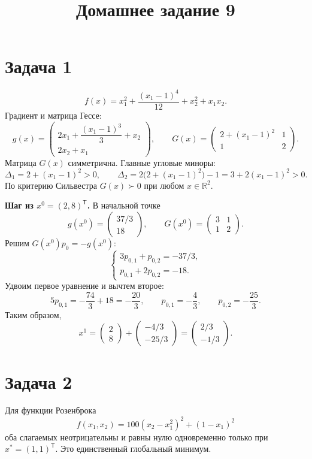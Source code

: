 \documentclass[12pt,a4paper]{article}
\title{Домашнее задание 9}
\author{}
\date{}
\newcommand{\R}{\mathbb R}
\newcommand{\T}{^{\mathsf T}}
\begin{document}
\maketitle

\section*{Задача 1}
\[
f(x)=x_1^2+\frac{(x_1-1)^4}{12}+x_2^2+x_1x_2.
\]
Градиент и матрица Гессе:
\[
g(x)=\begin{pmatrix}2x_1+\dfrac{(x_1-1)^3}{3}+x_2\\[4pt]2x_2+x_1\end{pmatrix},\qquad
G(x)=\begin{pmatrix}2+(x_1-1)^2&1\\1&2\end{pmatrix}.
\]
Матрица $G(x)$ симметрична. Главные угловые миноры:
\[
\Delta_1=2+(x_1-1)^2>0,\qquad
\Delta_2=2\bigl(2+(x_1-1)^2\bigr)-1=3+2(x_1-1)^2>0.
\]
По критерию Сильвестра $G(x)\succ0$ при любом $x\in\R^2$.

\textbf{Шаг из $x^0=(2,8)\T$.} В начальной точке
\[
g(x^0)=\begin{pmatrix}37/3\\18\end{pmatrix},\qquad
G(x^0)=\begin{pmatrix}3&1\\1&2\end{pmatrix}.
\]
Решим $G(x^0)p_0=-g(x^0)$:
\[
\begin{cases}3p_{0,1}+p_{0,2}=-37/3,\\p_{0,1}+2p_{0,2}=-18.\end{cases}
\]
Удвоим первое уравнение и вычтем второе:
\[
5p_{0,1}=-\frac{74}{3}+18=-\frac{20}{3},\qquad
p_{0,1}=-\frac43,\qquad p_{0,2}=-\frac{25}{3}.
\]
Таким образом,
\[
x^1=\begin{pmatrix}2\\8\end{pmatrix}+\begin{pmatrix}-4/3\\-25/3\end{pmatrix}
=\begin{pmatrix}2/3\\-1/3\end{pmatrix}.
\]


\section*{Задача 2}
Для функции Розенброка
\[
f(x_1,x_2)=100(x_2-x_1^2)^2+(1-x_1)^2
\]
оба слагаемых неотрицательны и равны нулю одновременно только при $x^*=(1,1)\T$. Это единственный глобальный минимум.
\end{document}
